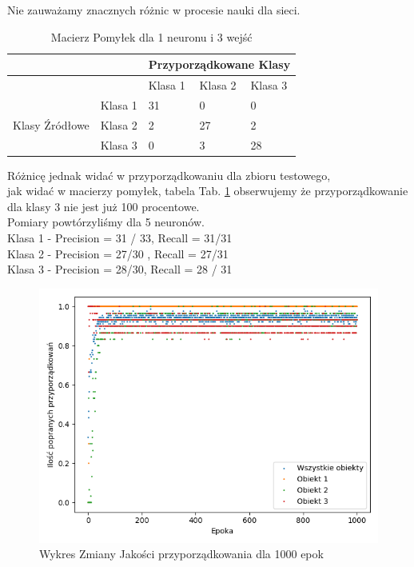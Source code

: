\documentclass[12pt]{article}
\begin{document}
Nie zauważamy znacznych różnic w procesie nauki dla sieci.\\


\begin{table}
\caption{\label{tab:tablica3} Macierz Pomyłek dla 1 neuronu i 3 wejść }
\begin{tabular}{ |p{3cm}|p{3cm}|p{2cm}|p{2cm}|p{2cm}|  }
 \hline
 & & 
 \multicolumn{3}{|c|}{Przyporządkowane Klasy} \\
 \hline

   & & Klasa 1 & Klasa 2 & Klasa 3\\
 \hline
\multirow{3}{4em}{Klasy Źródłowe}
   & Klasa 1 & 31 & 0 & 0 \\ 
   & Klasa 2 & 2 & 27 & 2 \\
   & Klasa 3 & 0 & 3 & 28 \\

 \hline
\end{tabular}
\end{table}
Różnicę jednak widać w przyporządkowaniu dla zbioru testowego, \\ jak widać w macierzy pomyłek, tabela Tab. \ref{tab:tablica3} obserwujemy że przyporządkowanie dla klasy 3 nie jest już 100 procentowe.\\ Pomiary powtórzyliśmy dla 5 neuronów.
\\Klasa 1 - Precision = 31 / 33, Recall = 31/31\\
Klasa 2 - Precision = 27/30 , Recall = 27/31\\
Klasa 3 - Precision = 28/30, Recall = 28 / 31\\

\begin{figure}[!ht]
 \centering
 \includegraphics[width=12cm]{WykresPrzyporzadkowania5neuron3wejscia.png}
 \caption{Wykres Zmiany Jakości przyporządkowania dla 1000 epok}
 \vspace{-0.1cm}
 \label{WykresPrzyp4}
\end{figure}
\end{document}
